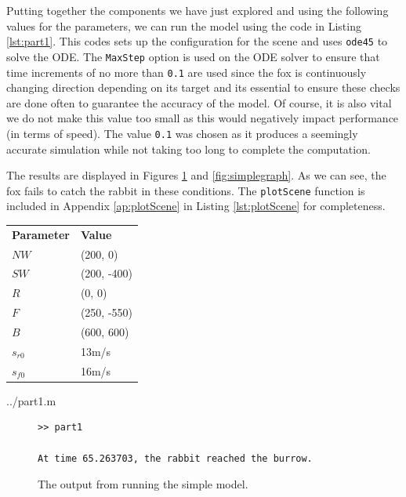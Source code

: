
 Putting together the components we have just explored and using the following values for the parameters, we can run the model using the code in Listing \ref{lst:part1}. This codes sets up the configuration for the scene and uses \texttt{ode45} to solve the ODE. The \texttt{MaxStep} option is used on the ODE solver to ensure that time increments of no more than \texttt{0.1} are used since the fox is continuously changing direction depending on its target and its essential to ensure these checks are done often to guarantee the accuracy of the model. Of course, it is also vital we do not make this value too small as this would negatively impact performance (in terms of speed). The value \texttt{0.1} was chosen as it produces a seemingly accurate simulation while not taking too long to complete the computation.
 
 The results are displayed in Figures \ref{output:simple} and  \ref{fig:simplegraph}. As we can see, the fox fails to catch the rabbit in these conditions. The \texttt{plotScene} function is included in Appendix \ref{ap:plotScene} in Listing \ref{lst:plotScene} for completeness.
 
 \begin{table}[h]
 \centering
\begin{tabular}{ll}
\textbf{Parameter} & \textbf{Value}       \\
$NW$      & (200, 0)    \\
$SW$      & (200, -400) \\
$R$       & (0, 0)      \\
$F$       & (250, -550) \\
$B$       & (600, 600)  \\
$s_{r0}$  & 13m/s       \\
$s_{f0}$  & 16m/s      
\end{tabular}
\end{table}

  {../part1.m}
 
 \begin{figure}[h]
 \caption{The output from running the simple model.}
 \label{output:simple}
 \begin{verbatim}
>> part1

At time 65.263703, the rabbit reached the burrow.

 \end{verbatim}
 \end{figure}

